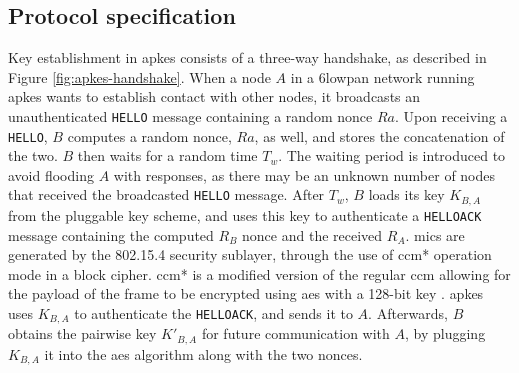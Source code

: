 


\subsection{Protocol specification}
\label{subsec:apkes-spec}

Key establishment in \gls{apkes} consists of a three-way handshake, as described in Figure \ref{fig:apkes-handshake}. When a node $A$ in a \gls{6lowpan} network running \gls{apkes} wants to establish contact with other nodes, it broadcasts an unauthenticated \texttt{HELLO} message containing a random nonce $Ra$. Upon receiving a \texttt{HELLO}, $B$ computes a random nonce, $Ra$, as well, and stores the concatenation of the two. $B$ then waits for a random time $T_w$. The waiting period is introduced to avoid flooding $A$ with responses, as there may be an unknown number of nodes that received the broadcasted \texttt{HELLO} message. After $T_w$, $B$ loads its key $K_{B,A}$ from the pluggable key scheme, and uses this key to authenticate a \texttt{HELLOACK} message containing the computed $R_B$ nonce and the received $R_A$. \gls{mic}s are generated by the 802.15.4 security sublayer, through the use of \gls{ccm}* operation mode in a block cipher. \gls{ccm}* is a modified version of the regular \gls{ccm} allowing for the payload of the frame to be encrypted using \gls{aes} with a 128-bit key \cite{krentz20136lowpan}. \gls{apkes} uses $K_{B,A}$ to authenticate the \texttt{HELLOACK}, and sends it to $A$. Afterwards, $B$ obtains the pairwise key $K'_{B,A}$ for future communication with $A$, by plugging $K_{B,A}$ it into the \gls{aes} algorithm along with the two nonces.


